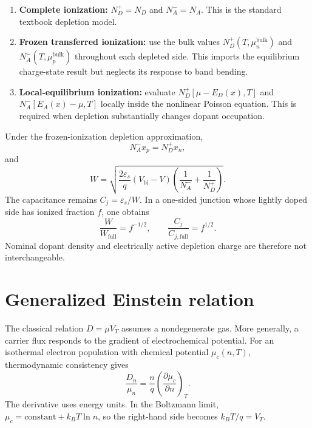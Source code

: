 \begin{enumerate}
 \item \textbf{Complete ionization:}
 $N_D^+=N_D$ and $N_A^-=N_A$.  This is the standard textbook depletion model.
 \item \textbf{Frozen transferred ionization:}
 use the bulk values $N_D^+(T,\mu_n^{\mathrm{bulk}})$ and
 $N_A^-(T,\mu_p^{\mathrm{bulk}})$ throughout each depleted side.  This imports
 the equilibrium charge-state result but neglects its response to band bending.
 \item \textbf{Local-equilibrium ionization:}
 evaluate $N_D^+[\mu-E_D(x),T]$ and $N_A^-[E_A(x)-\mu,T]$ locally inside the
 nonlinear Poisson equation.  This is required when depletion substantially
 changes dopant occupation.
\end{enumerate}

Under the frozen-ionization depletion approximation,
\begin{equation}
 N_A^-x_p=N_D^+x_n,
 \label{eq:ionized-depletion-neutrality}
\end{equation}
and
\begin{equation}
 \boxed{
 W=\sqrt{\frac{2\varepsilon_s}{q}(V_{\mathrm{bi}}-V)
 \left(\frac{1}{N_A^-}+\frac{1}{N_D^+}\right)}.
 }
 \label{eq:ionized-depletion-width}
\end{equation}
The capacitance remains $C_j=\varepsilon_s/W$.  In a one-sided junction whose
lightly doped side has ionized fraction $f$, one obtains
\begin{equation}
 \frac{W}{W_{\mathrm{full}}}=f^{-1/2},
 \qquad
 \frac{C_j}{C_{j,\mathrm{full}}}=f^{1/2}.
 \label{eq:ionization-depletion-scaling}
\end{equation}
Nominal dopant density and electrically active depletion charge are therefore
not interchangeable.

\section{Generalized Einstein relation}

The classical relation $D=\mu V_T$ assumes a nondegenerate gas.  More generally,
a carrier flux responds to the gradient of electrochemical potential.  For an
isothermal electron population with chemical potential $\mu_c(n,T)$,
thermodynamic consistency gives
\begin{equation}
 \boxed{
 \frac{D_n}{\mu_n}
 =\frac{n}{q}\left(\frac{\partial\mu_c}{\partial n}\right)_T.
 }
 \label{eq:generalized-einstein-thermodynamic}
\end{equation}
The derivative uses energy units.  In the Boltzmann limit,
$\mu_c=\mathrm{constant}+k_BT\ln n$, so the right-hand side becomes
$k_BT/q=V_T$.

